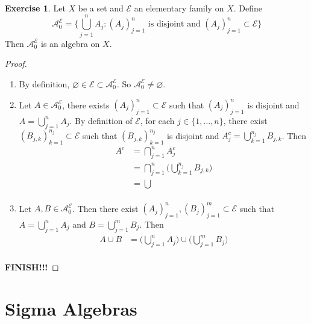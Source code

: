 \documentclass{book}
\theoremstyle{definition}
\newtheorem{ex}[definition]{Exercise}
\newcommand{\MA}{\mathcal{A}}
\newcommand{\ME}{\mathcal{E}}
\newcommand{\lex}[1]{\label{ex:#1}}
\DeclareMathOperator*{\0}{\mbf{0}}
\DeclareMathOperator*{\1}{\mbf{1}}
\begin{document}
	\begin{ex} \lex{00000} 
		Let $X$ be a set and $\ME$ an elementary family on $X$. Define $$\MA^{\ME}_0 = \bigg \{ \bigcup_{j=1}^n A_j: (A_j)_{j=1}^n \text{ is disjoint and } (A_j)_{j=1}^n \subset \ME \bigg \}$$ Then $\MA^{\ME}_0$ is an algebra on $X$.
	\end{ex}	
	
	\begin{proof}\
		\begin{enumerate}
			\item By definition, $\varnothing \in \ME \subset \MA^{\ME}_0$. So $\MA^{\ME}_0 \neq \varnothing$. 
			\item Let $A \in \MA^{\ME}_0$, there exists $(A_j)_{j=1}^n \subset \ME$ such that $(A_j)_{j=1}^n$ is disjoint and $A = \bigcup\limits_{j =1}^n A_j$. By definition of $\ME$, for each $j \in \{1, \ldots, n\}$, there exist $(B_{j,k})_{k=1}^{n_j} \subset \ME$ such that $(B_{j,k})_{k=1}^{n_j}$ is disjoint and $A_j^c = \bigcup\limits_{k=1}^{n_j}B_{j,k}$. Then 
			\begin{align*}
				A^c 
				&= \bigcap_{j=1}^n A_j^c \\
				&= \bigcap_{j=1}^n \bigg( \bigcup\limits_{k=1}^{n_j}B_{j,k} \bigg)\\
				&= \bigcup\\
			\end{align*}	 
			\item Let $A, B \in \MA^{\ME}_0$. Then there exist $(A_j)_{j=1}^n, (B_j)_{j=1}^m \subset \ME$ such that $A = \bigcup\limits_{j=1}^n A_j$ and  $B = \bigcup\limits_{j=1}^m B_j$. Then 
			\begin{align*}
				A \cup B 
				&=  \bigg( \bigcup\limits_{j=1}^n A_j \bigg) \cup \bigg( \bigcup\limits_{j=1}^m B_j \bigg) \\
			\end{align*}
		\end{enumerate}
		\textbf{FINISH!!!}
	\end{proof}

	
























	\newpage
	\section{Sigma Algebras}
		
\end{document}
